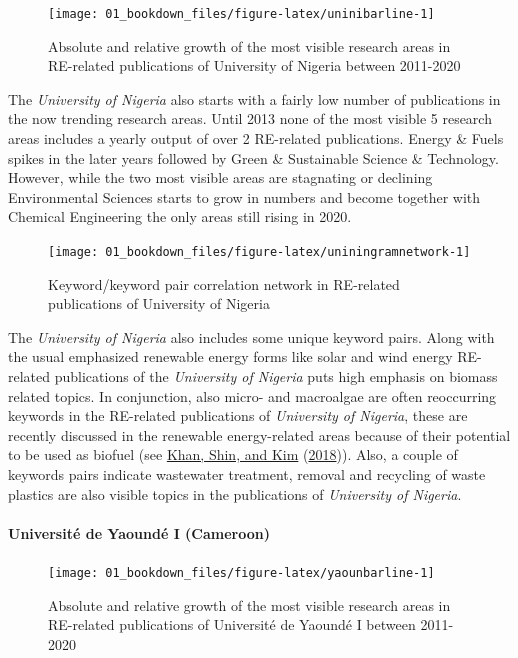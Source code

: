 \documentclass[
]{book}
\begin{document}
\begin{figure}
\texttt{[image: 01\_bookdown\_files/figure-latex/uninibarline-1]} \caption{Absolute and relative growth of the most visible research areas in RE-related publications of University of Nigeria between 2011-2020}\label{fig:uninibarline}
\end{figure}

The \emph{University of Nigeria} also starts with a fairly low number of publications in the now trending research areas. Until 2013 none of the most visible 5 research areas includes a yearly output of over 2 RE-related publications. Energy \& Fuels spikes in the later years followed by Green \& Sustainable Science \& Technology. However, while the two most visible areas are stagnating or declining Environmental Sciences starts to grow in numbers and become together with Chemical Engineering the only areas still rising in 2020.

\begin{figure}
\texttt{[image: 01\_bookdown\_files/figure-latex/uniningramnetwork-1]} \caption{Keyword/keyword pair correlation network in RE-related publications of University of Nigeria}\label{fig:uniningramnetwork}
\end{figure}

The \emph{University of Nigeria} also includes some unique keyword pairs. Along with the usual emphasized renewable energy forms like solar and wind energy RE-related publications of the \emph{University of Nigeria} puts high emphasis on biomass related topics. In conjunction, also micro- and macroalgae are often reoccurring keywords in the RE-related publications of \emph{University of Nigeria}, these are recently discussed in the renewable energy-related areas because of their potential to be used as biofuel (see \protect\hyperlink{ref-khan2018}{Khan, Shin, and Kim} (\protect\hyperlink{ref-khan2018}{2018})). Also, a couple of keywords pairs indicate wastewater treatment, removal and recycling of waste plastics are also visible topics in the publications of \emph{University of Nigeria}.

\hypertarget{universituxe9-de-yaounduxe9-i-cameroon}{%
\paragraph{Université de Yaoundé I (Cameroon)}\label{universituxe9-de-yaounduxe9-i-cameroon}}

\begin{figure}
\texttt{[image: 01\_bookdown\_files/figure-latex/yaounbarline-1]} \caption{Absolute and relative growth of the most visible research areas in RE-related publications of Université de Yaoundé I between 2011-2020}\label{fig:yaounbarline}
\end{figure}
\end{document}
